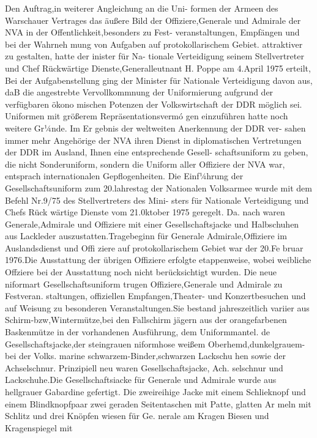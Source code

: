 Den Auftrag,in weiterer Angleichung an die Uni-
formen der Armeen des Warschauer Vertrages das
äußere Bild der Offiziere,Generale und Admirale
der NVA in der Offentlichkeit,besonders zu Fest-
veranstaltungen, Empfängen und bei der Wahrneh
mung von Aufgaben auf protokollarischem Gebiet.
attraktiver zu gestalten, hatte der inister für Na-
tionale Verteidigung seinem Stellvertreter und Chef
Rückwärtige Dienste,Generalleutnant H. Poppe
am 4.April 1975 erteilt, Bei der Aufgabenstellung
ging der Minister für Nationale Verteidigung davon
aus, daB die angestrebte Vervollkommnung der
Uniformierung aufgrund der verfügbaren ökono
mischen Potenzen der Volkswirtschaft der DDR
möglich sei.
Uniformen mit größerem Repräsentationsvermó
gen einzuführen hatte noch weitere Gr¼nde. Im Er
gebnis der weltweiten Anerkennung der DDR ver-
sahen immer mehr Angehörige der NVA ihren
Dienst in diplomatischen Vertretungen der DDR
im Ausland, Ihnen eine entsprechende Gesell-
schaftsuniform zu geben, die nicht Sonderuniform,
sondern die Uniform aller Offiziere der NVA war,
entsprach internationalen Gepflogenheiten.
Die Einf¼hrung der Gesellschaftsuniform zum
20.lahrestag der Nationalen Volksarmee wurde mit
dem Befehl Nr.9/75 des Stellvertreters des Mini-
sters für Nationale Verteidigung und Chefs Rück
wärtige Dienste vom 21.0ktober 1975 geregelt. Da.
nach waren Generale,Admirale und Offiziere mit
einer Gesellschaftsjacke und Halbschuhen aus
Lackleder auszustatten.Tragebeginn für Generale
Admirale,Offiziere im Auslandsdienst und Offi
ziere auf protokollarischem Gebiet war der 20.Fe
bruar 1976.Die Ausstattung der übrigen Offiziere
erfolgte etappenweise, wobei weibliche Offziere bei
der Ausstattung noch nicht berücksichtigt wurden.
Die neue niformart Gesellschaftsuniform trugen Offiziere,Generale und Admirale zu Festveran.
staltungen, offiziellen Empfangen,Theater- und
Konzertbesuchen und auf Weisung zu besonderen
Veranstaltungen.Sie bestand jahreszeitlich variier
aus Schirm-bzw,Wintermütze,bei den Fallschirm
jägern aus der orangefarbenen Baskenmütze in der
vorhandenen Ausführung, dem Uniformmantel. de
Gesellschaftsjacke,der steingrauen niformhose
weißem Oberhemd,dunkelgrauem- bei der Volks.
marine schwarzem-Binder,schwarzen Lackschu
hen sowie der Achselschnur.
Prinzipiell neu waren Gesellschaftsjacke, Ach.
selschnur und Lackschuhe.Die Gesellschaftsiacke
für Generale und Admirale wurde aus hellgrauer
Gabardine gefertigt. Die zweireihige Jacke mit
einem Schlieknopf und einem Blindknopfpaar
zwei geraden Seitentaschen mit Patte, glatten Ar
meln mit Schlitz und drei Knöpfen wiesen für Ge.
nerale am Kragen Biesen und Kragenspiegel mit
